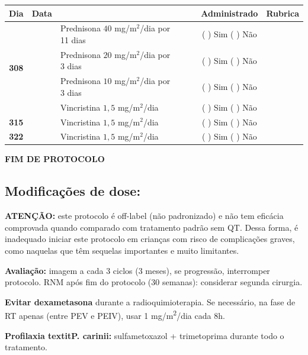 \documentclass[11pt,a4paper,oldfontcommands]{memoir}
\begin{document}
\begin{center}
\begin{longtable}{p{1cm}c|p{5cm}|p{1cm}p{2cm}|c|c}
	\hline
	\multicolumn{1}{c|}{\multirow{1}{*}{\textbf{Dia}}}&{Data}&{}&{}&&{Administrado}&{Rubrica} \\
    \hline
    \multicolumn{1}{c|}{\multirow{4}{*}{\textbf{308}}}&&{Prednisona \(40\) mg/m\(^2\)/dia por 11 dias}&\multicolumn{1}{c}{}&&{(  ) Sim (  ) Não}&\\
    \multicolumn{1}{c|}{}&&{Prednisona \(20\) mg/m\(^2\)/dia por 3 dias}&\multicolumn{1}{c}{}&&{(  ) Sim (  ) Não}&\\
    \multicolumn{1}{c|}{}&&{Prednisona \(10\) mg/m\(^2\)/dia por 3 dias}&\multicolumn{1}{c}{}&&{(  ) Sim (  ) Não}&\\
    \multicolumn{1}{c|}{\textbf{}}&&{Vincristina \(1,5\) mg/m\(^2\)/dia}&\multicolumn{1}{c}{}&&{(  ) Sim (  ) Não}&\\
    \cline{1-6}
    \multicolumn{1}{c|}{\textbf{315}}&&{Vincristina \(1,5\) mg/m\(^2\)/dia}&\multicolumn{1}{c}{}&&{(  ) Sim (  ) Não}&\\
    \cline{1-3}\cline{6-6}
    \multicolumn{1}{c|}{\textbf{322}}&&{Vincristina \(1,5\) mg/m\(^2\)/dia}&\multicolumn{1}{c}{}&&{(  ) Sim (  ) Não}&\\
    \hline
\end{longtable}

\textbf{FIM DE PROTOCOLO}

\end{center}
\subsection{Modificações de dose:}
\textbf{ATENÇÃO:} este protocolo é off-label (não padronizado) e não tem eficácia comprovada quando comparado com tratamento padrão sem QT. Dessa forma, é inadequado iniciar este protocolo em crianças com risco de complicações graves, como naquelas que têm sequelas importantes e muito limitantes.

\textbf{Avaliação:} imagem a cada 3 ciclos (3 meses), se progressão, interromper protocolo. RNM após fim do protocolo (30 semanas): considerar segunda cirurgia.

\textbf{Evitar dexametasona} durante a radioquimioterapia. Se necessário, na fase de RT apenas (entre PEV e PEIV), usar 1 mg/m\textsuperscript{2}/dia cada 8h.

\textbf{Profilaxia textit{P. carinii:}} sulfametoxazol + trimetoprima durante todo o tratamento.
\end{document}
